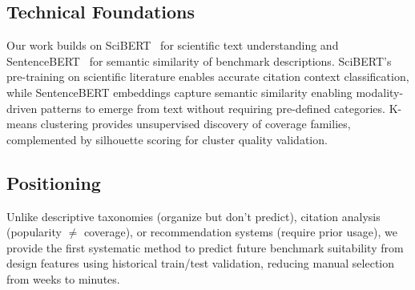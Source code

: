 \subsection{Technical Foundations}

Our work builds on SciBERT~\cite{scibert} for scientific text understanding and SentenceBERT~\cite{sentencebert} for semantic similarity of benchmark descriptions. SciBERT's pre-training on scientific literature enables accurate citation context classification, while SentenceBERT embeddings capture semantic similarity enabling modality-driven patterns to emerge from text without requiring pre-defined categories. K-means clustering provides unsupervised discovery of coverage families, complemented by silhouette scoring for cluster quality validation.

\subsection{Positioning}

Unlike descriptive taxonomies (organize but don't predict), citation analysis (popularity $\neq$ coverage), or recommendation systems (require prior usage), we provide the first systematic method to predict future benchmark suitability from design features using historical train/test validation, reducing manual selection from weeks to minutes.
